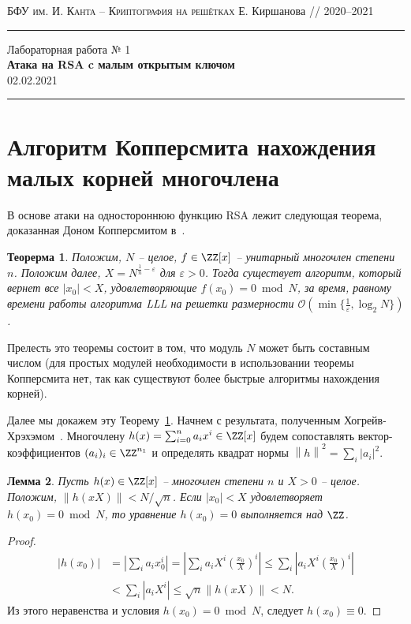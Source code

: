 \documentclass[11pt]{exam}
\newtheorem{theorem}{Теорерма}
\newtheorem{lemma}[theorem]{Лемма}
\theoremstyle{definition}
\newcommand{\bigO}{\mathcal{O}}
\newcommand*\abs[1]{\left\lvert#1\right\rvert}
\newcommand*\norm[1]{\left\lVert#1\right\rVert}
\begin{document}
	{\noindent
		\textsc{БФУ им. И. Канта -- Криптография на решётках}
		\hfill {Е. Киршанова // 2020--2021\\}
\hrule
\begin{center}
	{\LARGE
			Лабораторная работа № 1 \\[5pt]
			\textbf{Атака на RSA c малым открытым ключом } \\[10pt]
	 	{02.02.2021} 
 	} 
\end{center}
\hrule \vspace{5mm}
	
	\thispagestyle{empty}
	
	\vspace{0.2cm}
	\section{Алгоритм Копперсмита нахождения малых корней многочлена}
	
	В основе атаки на одностороннюю функцию RSA лежит следующая теорема, доказанная Доном Копперсмитом в~\cite{Coppersmith}.
	
	\begin{theorem}\label{thm:Coppersmith}
		Положим, $N$ -- целое, $f\in \ZZ[x]$ -- унитарный многочлен степени $n$. Положим далее, $X = N^{\frac{1}{n}-\varepsilon}$ для $\varepsilon>0$. Тогда существует алгоритм, который вернет все $|x_0| < X$, удовлетворяющие $f(x_0) =0 \bmod N$, за время, равному времени работы алгоритма LLL на решетки размерности $\bigO(\min\{ \frac{1}{\varepsilon}, \log_2 N \})$.
	\end{theorem}

	Прелесть это теоремы состоит в том, что модуль $N$ может быть составным числом (для простых модулей необходимости в использовании теоремы Копперсмита нет, так как существуют более быстрые алгоритмы нахождения корней).
	
	Далее мы докажем эту Теорему~\ref{thm:Coppersmith}. Начнем с результата, полученным Хогрейв-Хрэхэмом~\cite{HG}. Многочлену $h(x) = \sum_{i=0}^{n} a_i x^i \in \ZZ[x]$ будем сопоставлять вектор-коэффициентов $(a_i)_i\in \ZZ^{n_1}$ и определять квадрат нормы $\norm{h}^2 = \sum_i \abs{a_i}^2$. 
	\begin{lemma}\label{lem:HG}
		Пусть $h(x) \in \ZZ[x]$ -- многочлен степени $n$ и $X>0$ -- целое. Положим, $\norm{h(xX)} < N / \sqrt{n}$. Если $\abs{x_0} < X$ удовлетворяет $h(x_0) = 0 \bmod N$, то уравнение $h(x_0) = 0$ выполняется над $\ZZ$.
	\end{lemma}
	\begin{proof}
	\begin{align*}
		\abs{h(x_0)} &=\abs{\sum_i a_i x^i_0} = \abs{ \sum_i a_i X^i \left( \frac{x_0}{X} \right)^i} \leq \sum_i \abs{a_i X^i \left( \frac{x_0}{X} \right)^i} \\
		& < \sum_i \abs{a_i X^i} \leq \sqrt{n} \norm{h(xX)} < N. 
	\end{align*}
	Из этого неравенства и условия $h(x_0) = 0 \bmod N$, следует $h(x_0) \equiv 0$. 
	\end{proof}

}
\end{document}

